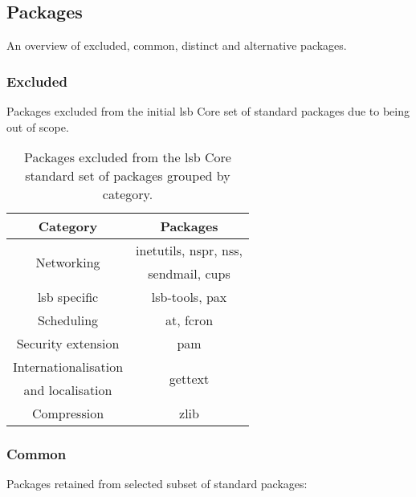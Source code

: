 \subsection{Packages}\label{Packages}

An overview of excluded, common, distinct and alternative packages.

\subsubsection{Excluded}

Packages excluded from the initial \gls{lsb} Core set of standard packages due to being out of scope.

\begin{table}[!h]
    \centering
    \begin{tabular}{|c|c|}
    \hline
    Category & Packages \\
    \hline
    \hline
    \multirow{2}{*}{Networking} & inetutils\cite{inetutils}, nspr\cite{nspr}, nss\cite{nss}, \\
    & sendmail\cite{sendmail}, cups\cite{cups} \\
    \hline
    \gls{lsb} specific & lsb-tools\cite{lsb-tools}, pax\cite{pax} \\
    \hline
    Scheduling & at\cite{at}, fcron\cite{fcron} \\
    \hline
    Security extension & pam\cite{linux-pam} \\
    \hline
    Internationalisation & \multirow{2}{*}{gettext\cite{gettext}} \\
    and localisation & \\
    \hline
    Compression & zlib\cite{zlib} \\
    \hline
    \end{tabular}
    \caption{Packages excluded from the \gls{lsb} Core standard set of packages grouped by category.}
\end{table}

\subsubsection{Common}

Packages retained from selected subset of standard packages:

